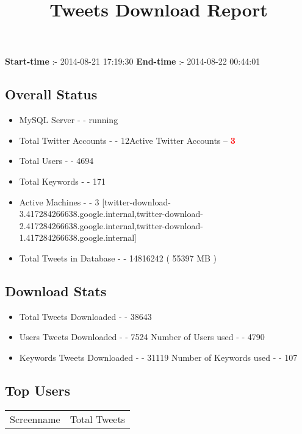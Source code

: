 \documentclass{article}\usepackage[T1]{fontenc}
\begin{document}
\title{\textbf{Tweets Download Report}}
               \date{}
                \maketitle
               \centerline{\textbf{Start-time} :- 2014-08-21 17:19:30 \hspace{40pt} \textbf{End-time} :- 2014-08-22 00:44:01}               \subsection*{Overall Status}                \begin{itemize}                \item MySQL Server - - running               \item Total Twitter Accounts - - 12\newline Active Twitter Accounts -- \textcolor{red}{\textbf{3}}               \item Total Users - - 4694               \item Total Keywords - - 171               \item Active Machines - - 3 [twitter-download-3.417284266638.google.internal,twitter-download-2.417284266638.google.internal,twitter-download-1.417284266638.google.internal]               \item Total Tweets in Database - - 14816242 ( 55397 MB )               \end{itemize}               \subsection*{Download Stats}                \begin{itemize}                \item Total Tweets Downloaded - - 38643               \item Users Tweets Downloaded - - 7524 \newline Number of Users used - - 4790               \item Keywords Tweets Downloaded - - 31119 \newline Number of Keywords used - - 107              \end{itemize}              \subsection*{Top Users}\begin{tabular}{|c|c|}         \hline         Screenname & Total Tweets \\ 

\end{tabular}
\end{document}
